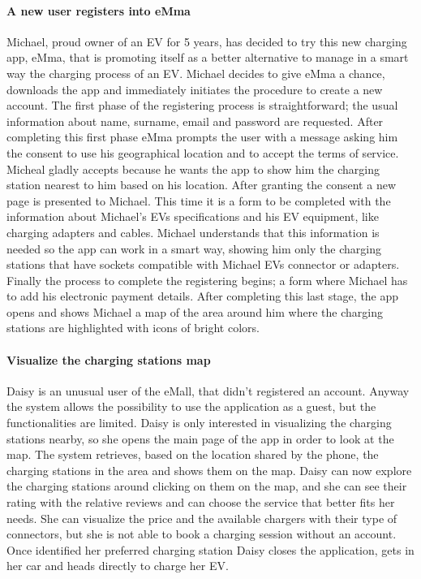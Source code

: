 \paragraph{A new user registers into eMma}
Michael, proud owner of an EV for 5 years, has decided to try this new charging app, eMma, that is promoting itself as a better alternative to manage in a smart way the charging process of an EV. Michael decides to give eMma a chance, downloads the app and immediately initiates the procedure to create a new account. The first phase of the registering process is straightforward; the usual information about name, surname, email and password are requested. After completing this first phase eMma prompts the user with a message asking him the consent to use his geographical location and to accept the terms of service. Micheal gladly accepts because he wants the app to show him the charging station nearest to him based on his location. After granting the consent a new page is presented to Michael. This time it is a form to be completed with the information about Michael’s EVs specifications and his EV equipment, like charging adapters and cables. Michael understands that this information is needed so the app can work in a smart way, showing him only the charging stations that have sockets compatible with Michael EVs connector or adapters. Finally the process to complete the registering begins; a form where Michael has to add his electronic payment details. After completing this last stage, the app opens and shows Michael a map of the area around him where the charging stations are highlighted with icons of bright colors.


\paragraph{Visualize the charging stations map}
Daisy is an unusual user of the eMall, that didn't registered an account. Anyway the system allows the possibility to use the application as a guest, but the functionalities are limited. Daisy is only interested in visualizing the charging stations nearby, so she opens the main page of the app in order to look at the map. The system retrieves, based on the location shared by the phone, the charging stations in the area and shows them on the map. Daisy can now explore the charging stations around clicking on them on the map, and she can see their rating with the relative reviews and can choose the service that better fits her needs. She can visualize the price and the available chargers with their type of connectors, but she is not able to book a charging session without an account. Once identified her preferred charging station Daisy closes the application, gets in her car and heads directly to charge her EV.


